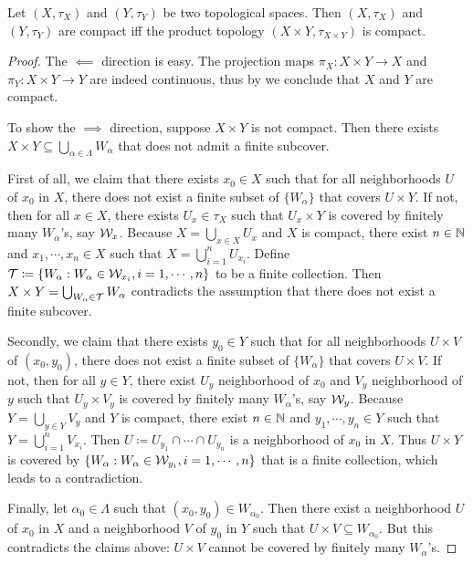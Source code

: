 \documentclass{techreport}
\begin{document}
\begin{theorem}\label{The:ProductOfCompactStillCompact}
	Let $(X,\tau_X)$ and $(Y,\tau_Y)$ be two topological spaces.
	Then $(X,\tau_X)$ and $(Y,\tau_Y)$ are compact iff the product topology $(X \times Y,\tau_{X \times Y})$ is compact. 
\end{theorem}
\begin{proof}
	The $\impliedby$ direction is easy.
	The projection maps $\pi_X : X \times Y \to X$ and $\pi_Y : X \times Y \to Y$ are indeed continuous, thus by  we conclude that $X$ and $Y$ are compact.
	
	To show the $\implies$ direction, suppose $X \times Y$ is not compact.
	Then there exists $X \times Y \subseteq \bigcup_{\alpha \in \Lambda} W_\alpha$ that does not admit a finite subcover.
	
	First of all, we claim that there exists $x_0 \in X$ such that for all neighborhoods $U$ of $x_0$ in $X$, there does not exist a finite subset of $\{W_\alpha\}$ that covers $U \times Y$.
	If not, then for all $x \in X$, there exists $U_x \in \tau_X$ such that $U_x \times Y$ is covered by finitely many $W_\alpha$'s, say $\mathcal{W}_x$.
	Because $X = \bigcup_{x \in X} U_x$ and $X$ is compact, there exist $n \in \mathbb{N}$ and $x_1,\cdots,x_n \in X$ such that $X = \bigcup_{i=1}^n U_{x_i}$.
	Define $\mathcal{T} \coloneqq \{ W_\alpha : W_\alpha \in \mathcal{W}_{x_i}, i=1,\cdots,n\}$ to be a finite collection.
	Then $X \times Y = \bigcup_{W_\alpha \in \mathcal{T}} W_\alpha$ contradicts the assumption that there does not exist a finite subcover.
	
	Secondly, we claim that there exists $y_0 \in Y$ such that for all neighborhoods $U \times V$ of $(x_0,y_0)$, there does not exist a finite subset of $\{ W_\alpha \}$ that covers $U \times V$.
	If not, then for all $y \in Y$, there exist $U_y$ neighborhood of $x_0$ and $V_y$ neighborhood of $y$ such that $U_y \times V_y$ is covered by finitely many $W_\alpha$'s, say $\mathcal{W}_y$.
	Because $Y = \bigcup_{y \in Y} V_y$ and $Y$ is compact, there exist $n \in \mathbb{N}$ and $y_1,\cdots,y_n \in Y$ such that $Y = \bigcup_{i=1}^n V_{x_i}$.
	Then $U \coloneqq U_{y_1} \cap \cdots \cap U_{y_n}$ is a neighborhood of $x_0$ in $X$.
	Thus $U \times Y$ is covered by $\{ W_\alpha : W_\alpha \in \mathcal{W}_{y_i}, i=1,\cdots,n\}$ that is a finite collection, which leads to a contradiction.
	
	Finally, let $\alpha_0 \in \Lambda$ such that $(x_0,y_0) \in W_{\alpha_0}$.
	Then there exist a neighborhood $U$ of $x_0$ in $X$ and a neighborhood $V$ of $y_0$ in $Y$ such that $U \times V \subseteq W_{\alpha_0}$.
	But this contradicts the claims above: $U \times V$ cannot be covered by finitely many $W_\alpha$'s.
\end{proof}
\end{document}
